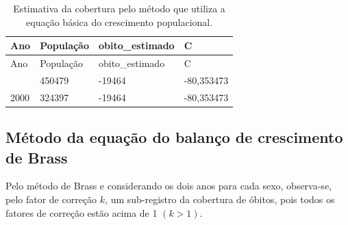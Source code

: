 \documentclass[
  12pt,
  a4paper,
]{scrreprt}
\begin{document}
\begin{longtable}[]{@{}llll@{}}
\caption{Estimativa da cobertura pelo método que utiliza a equação
básica do crescimento populacional.}\label{T_6f4fc}\tabularnewline
\toprule\noalign{}
Ano & População & obito\_estimado & C \\
\midrule\noalign{}
\endfirsthead
\toprule\noalign{}
Ano & População & obito\_estimado & C \\
\midrule\noalign{}
\endhead
\bottomrule\noalign{}
\endlastfoot
2010 & 450479 & -19464 & -80,353473 \\
2000 & 324397 & -19464 & -80,353473 \\
\end{longtable}

\subsection{Método da equação do balanço de crescimento de
Brass}\label{muxe9todo-da-equauxe7uxe3o-do-balanuxe7o-de-crescimento-de-brass-1}

Pelo método de Brass e considerando os dois anos para cada sexo,
observa-se, pelo fator de correção \(k\), um sub-registro da cobertura
de óbitos, pois todos os fatores de correção estão acima de 1
\(\left(k > 1\right)\).
\end{document}
